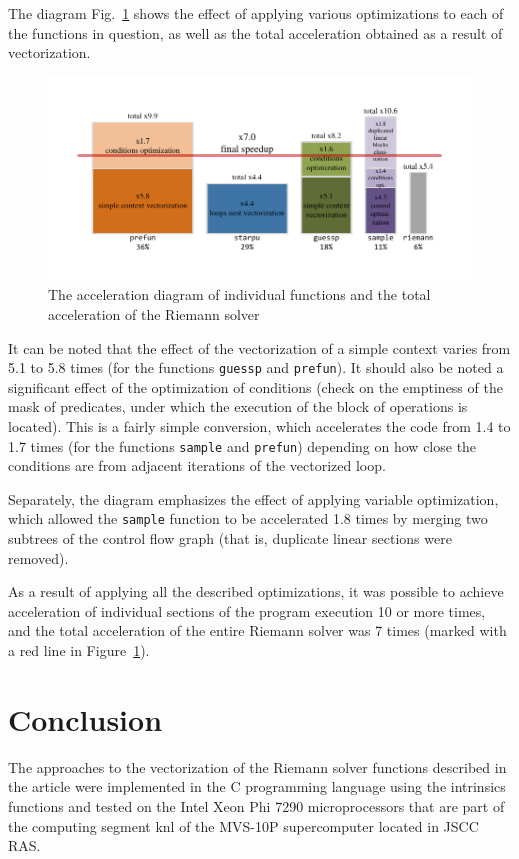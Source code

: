 \documentclass[utf8,english]{psta}%
\begin{document}
The diagram Fig.~\ref{pic:perf} shows the effect of applying various optimizations to each of the functions in question, as well as the total acceleration obtained as a result of vectorization.

\begin{figure}
\includegraphics[width=12cm]{pics/pic_perf_eng}
\caption{The acceleration diagram of individual functions and the total acceleration of the Riemann solver}
\label{pic:perf}
\end{figure}

It can be noted that the effect of the vectorization of a simple context varies from 5.1 to 5.8 times (for the functions \texttt{guessp} and \texttt{prefun}).
It should also be noted a significant effect of the optimization of conditions (check on the emptiness of the mask of predicates, under which the execution of the block of operations is located).
This is a fairly simple conversion, which accelerates the code from 1.4 to 1.7 times (for the functions \texttt{sample} and \texttt{prefun}) depending on how close the conditions are from adjacent iterations of the vectorized loop.

Separately, the diagram emphasizes the effect of applying variable optimization, which allowed the \texttt{sample} function to be accelerated 1.8 times by merging two subtrees of the control flow graph (that is, duplicate linear sections were removed).

As a result of applying all the described optimizations, it was possible to achieve acceleration of individual sections of the program execution 10 or more times, and the total acceleration of the entire Riemann solver was 7 times (marked with a red line in Figure~\ref{pic:perf}).

\section*{Conclusion}

The approaches to the vectorization of the Riemann solver functions described in the article were implemented in the C programming language using the intrinsics functions and tested on the Intel Xeon Phi 7290 microprocessors that are part of the computing segment knl of the MVS-10P supercomputer located in JSCC RAS.
\end{document}
